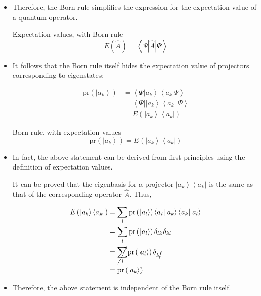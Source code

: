 \documentclass[9pt,handout]{beamer}
\newcommand{\pr}[0]{\text{pr}}
\begin{document}
\begin{frame}{}
\begin{itemize}
\item Therefore, the Born rule simplifies the expression for the expectation value of a quantum operator. 

\begin{block}{Expectation values, with Born rule}
$$E \left( \widehat{A} \right) = \left\langle \Psi \left\lvert \widehat{A} \right\rvert \Psi \right\rangle$$
\end{block}


\item It follows that the Born rule itself hides the expectation value of projectors corresponding to eigenstates:

\begin{align*}
\pr \left( \left\lvert a_k \right\rangle \right) & = \left\langle \Psi \right. \left\lvert a_k \right\rangle \left\langle a_k \right. \left\lvert \Psi \right\rangle \\
& = \left\langle \Psi \right\rvert \left\lvert a_k \right\rangle \left\langle a_k \right\rvert \left\lvert \Psi \right\rangle \\
& = E \left( \left\lvert a_k \right\rangle \left\langle a_k \right\rvert \right)
\end{align*}

\begin{block}{Born rule, with expectation values}
$$\pr \left( \left\lvert a_k \right\rangle \right) = E \left( \left\lvert a_k \right\rangle \left\langle a_k \right\rvert \right)$$
\end{block}
\end{itemize}
\end{frame}

\begin{frame}{}
\begin{itemize}
\item In fact, the above statement can be derived from first principles using the definition of expectation values. 

It can be proved that the eigenbasis for a projector $\left\lvert a_k \right\rangle \left\langle a_k \right\rvert$ is the same as that of the corresponding operator $\widehat{A}$. Thus,

\begin{align*}
E \left( \left\lvert a_k \right\rangle \left\langle a_k \right\rvert \right) & = \sum_l \pr \left( \left\lvert a_l \right\rangle \right) \left\langle a_l \right\rvert \left. a_k \right\rangle \left\langle a_k \right\rvert \left. a_l \right\rangle \\
& = \sum_l \pr \left( \left\lvert a_l \right\rangle \right) \delta_{l k} \delta_{k l} \\
& = \cancel{\sum_l} \pr \left( \left\lvert a_l \right\rangle \right) \delta_{k \cancel{l}} \\
& = \pr \left( \left\lvert a_k \right\rangle \right)
\end{align*}

\item Therefore, the above statement is independent of the Born rule itself.
\end{itemize}
\end{frame}
\end{document}
